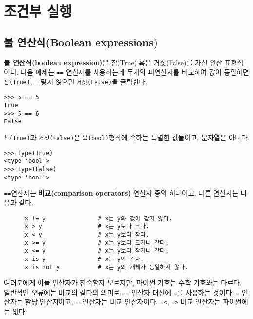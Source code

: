 
\chapter{조건부 실행}

\section{불 연산식(Boolean expressions)}

{\bf 불 연산식(boolean expression)}은 참(True) 혹은 거짓(False)를 가진 연산 표현식이다. 
다음 예제는 {\tt ==} 연산자를 사용하는데 두개의 피연산자를 비교하여 값이 동일하면 {\tt 참(True)}, 그렇지 않으면 {\tt 거짓(False)}을 출력한다.

\beforeverb
\begin{verbatim}
>>> 5 == 5
True
>>> 5 == 6
False
\end{verbatim}
\afterverb
%

{\tt 참(True)}과 {\tt 거짓(False)}은 {\tt 불(bool)}형식에 속하는 특별한 값들이고, 문자열은 아니다.


\beforeverb
\begin{verbatim}
>>> type(True)
<type 'bool'>
>>> type(False)
<type 'bool'>
\end{verbatim}
\afterverb
%

{\tt ==}연산자는 {\bf 비교(comparison operators)} 연산자 중의 하나이고, 다른 연산자는 다음과 같다.

\beforeverb
\begin{verbatim}
      x != y               # x는 y와 값이 같지 않다.
      x > y                # x는 y보다 크다.
      x < y                # x는 y보다 작다.
      x >= y               # x는 y보다 크거나 같다.
      x <= y               # x는 y보다 작거나 같다.
      x is y               # x는 y와 같다.
      x is not y           # x는 y와 개체가 동일하지 않다.
\end{verbatim}
\afterverb
%
여러분에게 이들 연산자가 친숙할지 모르지만, 파이썬 기호는 수학 기호와는 다르다. 
일반적인 오류에는 비교의 같다의 의미로 {\tt ==} 연산자 대신에 {\tt =}를 사용하는 것이다.
{\tt =} 연산자는 할당 연산자이고, {\tt ==}연산자는 비교 연산자이다. {\tt =<}, {\tt =>} 비교 연산자는 파이썬에는 없다.

